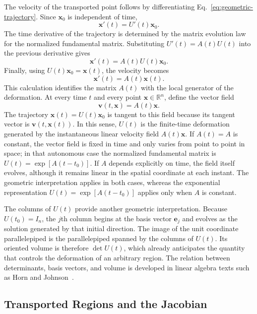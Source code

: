 \documentclass[11pt,a4paper]{article}
\newcommand{\be}{\begin{equation}}
\newcommand{\ee}{\end{equation}}
\newcommand{\lb}[1]{\label{#1}}
\newcommand{\R}{\mathbb{R}}
\theoremstyle{definition}
\numberwithin{equation}{section}
\begin{document}
The velocity of the transported point follows by differentiating Eq.~\eqref{eq:geometric-trajectory}. Since $\mathbf{x}_0$ is independent of time,
\be
\mathbf{x}'(t)=U'(t)\mathbf{x}_0.
\lb{eq:geometric-velocity1}
\ee
The time derivative of the trajectory is determined by the matrix evolution law for the normalized fundamental matrix. Substituting $U'(t)=A(t)U(t)$ into the previous derivative gives
\be
\mathbf{x}'(t)=A(t)U(t)\mathbf{x}_0.
\lb{eq:geometric-velocity-middle}
\ee
Finally, using $U(t)\mathbf{x}_0=\mathbf{x}(t)$, the velocity becomes
\be
\mathbf{x}'(t)=A(t)\mathbf{x}(t).
\lb{eq:geometric-velocity2}
\ee
This calculation identifies the matrix $A(t)$ with the local generator of the deformation. At every time $t$ and every point $\mathbf{x}\in\R^n$, define the vector field
\be
\mathbf{v}(t,\mathbf{x})=A(t)\mathbf{x}.
\lb{eq:linear-vector-field}
\ee
The trajectory $\mathbf{x}(t)=U(t)\mathbf{x}_0$ is tangent to this field because its tangent vector is $\mathbf{v}(t,\mathbf{x}(t))$. In this sense, $U(t)$ is the finite-time deformation generated by the instantaneous linear velocity field $A(t)\mathbf{x}$. If $A(t)=A$ is constant, the vector field is fixed in time and only varies from point to point in space; in that autonomous case the normalized fundamental matrix is $U(t)=\exp[A(t-t_0)]$. If $A$ depends explicitly on time, the field itself evolves, although it remains linear in the spatial coordinate at each instant. The geometric interpretation applies in both cases, whereas the exponential representation $U(t)=\exp[A(t-t_0)]$ applies only when $A$ is constant.

The columns of $U(t)$ provide another geometric interpretation. Because $U(t_0)=I_n$, the $j$th column begins at the basis vector $\mathbf{e}_j$ and evolves as the solution generated by that initial direction. The image of the unit coordinate parallelepiped is the parallelepiped spanned by the columns of $U(t)$. Its oriented volume is therefore $\det U(t)$, which already anticipates the quantity that controls the deformation of an arbitrary region. The relation between determinants, basis vectors, and volume is developed in linear algebra texts such as Horn and Johnson~\cite{horn2013}.

\subsection{Transported Regions and the Jacobian}
\end{document}
